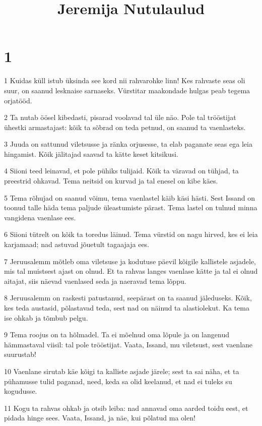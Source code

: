 

\title{Jeremija Nutulaulud}

\chapter{1}

\par 1 Kuidas küll istub üksinda see kord nii rahvarohke linn! Kes rahvaste seas oli suur, on saanud lesknaise sarnaseks. Vürstitar maakondade hulgas peab tegema orjatööd.
\par 2 Ta nutab öösel kibedasti, pisarad voolavad tal üle näo. Pole tal trööstijat ühestki armastajast: kõik ta sõbrad on teda petnud, on saanud ta vaenlasteks.
\par 3 Juuda on sattunud viletsusse ja ränka orjusesse, ta elab paganate seas ega leia hingamist. Kõik jälitajad saavad ta kätte keset kitsikusi.
\par 4 Siioni teed leinavad, et pole pühiks tulijaid. Kõik ta väravad on tühjad, ta preestrid ohkavad. Tema neitsid on kurvad ja tal enesel on kibe käes.
\par 5 Tema rõhujad on saanud võimu, tema vaenlastel käib käsi hästi. Sest Issand on toonud talle häda tema paljude üleastumiste pärast. Tema lastel on tulnud minna vangidena vaenlase ees.
\par 6 Siioni tütrelt on kõik ta toredus läinud. Tema vürstid on nagu hirved, kes ei leia karjamaad; nad astuvad jõuetult tagaajaja ees.
\par 7 Jeruusalemm mõtleb oma viletsuse ja kodutuse päevil kõigile kallistele asjadele, mis tal muistsest ajast on olnud. Et ta rahvas langes vaenlase kätte ja tal ei olnud aitajat, siis näevad vaenlased seda ja naeravad tema lõppu.
\par 8 Jeruusalemm on raskesti patustanud, seepärast on ta saanud jäleduseks. Kõik, kes teda austasid, põlastavad teda, sest nad on näinud ta alastiolekut. Ka tema ise ohkab ja tõmbub pelgu.
\par 9 Tema roojus on ta hõlmadel. Ta ei mõelnud oma lõpule ja on langenud hämmastaval viisil: tal pole trööstijat. Vaata, Issand, mu viletsust, sest vaenlane suurustab!
\par 10 Vaenlane sirutab käe kõigi ta kalliste asjade järele; sest ta sai näha, et ta pühamusse tulid paganad, need, keda sa olid keelanud, et nad ei tuleks su kogudusse.
\par 11 Kogu ta rahvas ohkab ja otsib leiba: nad annavad oma aarded toidu eest, et pidada hinge sees. Vaata, Issand, ja näe, kui põlatud ma olen!
